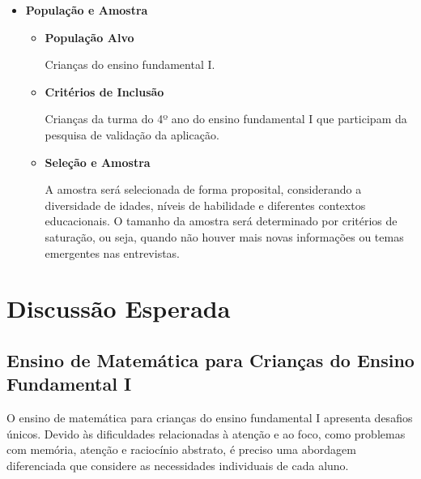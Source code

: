 \begin{itemize}
    \item \textbf{População e Amostra}
    
    \begin{itemize}
    
        \item \textbf{População Alvo}
    
        Crianças do ensino fundamental I.

        \item \textbf{Critérios de Inclusão}

        Crianças da turma do 4º ano do ensino fundamental I que participam da pesquisa de validação da aplicação.


        \item \textbf{Seleção e Amostra}

    A amostra será selecionada de forma proposital, considerando a diversidade de idades, níveis de habilidade e diferentes contextos educacionais. O tamanho da amostra será determinado por critérios de saturação, ou seja, quando não houver mais novas informações ou temas emergentes nas entrevistas.
    \end{itemize}

    
\end{itemize}

\section{Discussão Esperada}

\subsection{Ensino de Matemática para Crianças do Ensino Fundamental I}

O ensino de matemática para crianças do ensino fundamental I apresenta desafios únicos. Devido às dificuldades relacionadas à atenção e ao foco, como problemas com memória, atenção e raciocínio abstrato, é preciso uma abordagem diferenciada que considere as necessidades individuais de cada aluno.

